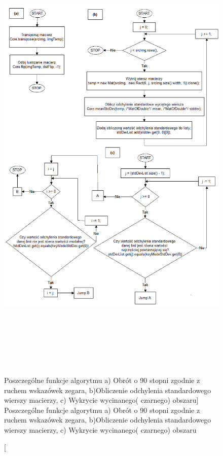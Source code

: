 \documentclass[a4paper,12pt]{article}
\begin{document}
    		    \begin{figure}[!ht]  
    			    \begin{center}
    				    \includegraphics[height=22cm, width=17cm] {image//algorithm//cutBlackAreaPred.png} 
    			    \end{center}
    			    \caption
            			[Poszczególne funkcje algorytmu a) Obrót o 90 stopni zgodnie z ruchem wskazówek zegara, b)Obliczenie odchylenia standardowego wierszy macierzy, c) Wykrycie wycinanego( czarnego) obszaru]  
        	    		{Poszczególne funkcje algorytmu a) Obrót o 90 stopni zgodnie z ruchem wskazówek zegara, b)Obliczenie odchylenia standardowego wierszy macierzy, c) Wykrycie wycinanego( czarnego) obszaru}
    		    \end{figure}
			    
\end{document}
